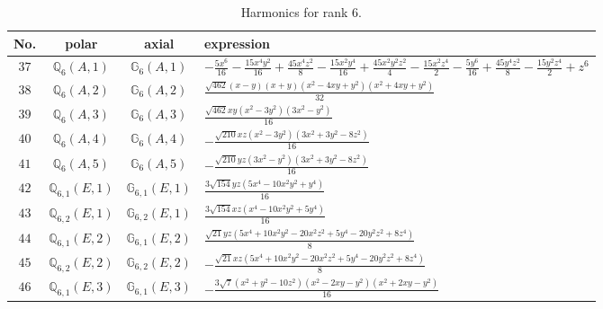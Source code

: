 \documentclass[fleqn,8pt,landscape]{jsarticle}
\begin{document}
\begin{table}[ht!]
\begin{center}
\caption{Harmonics for rank 6.}
\renewcommand{\arraystretch}{1.3}
\begin{tabular}{cccl} \hline \hline
No. & polar & axial & expression \\ \hline
$ 37 $ & $ \mathbb{Q}_{6}(A,1) $ & $ \mathbb{G}_{6}(A,1) $ & $ - \frac{5 x^{6}}{16} - \frac{15 x^{4} y^{2}}{16} + \frac{45 x^{4} z^{2}}{8} - \frac{15 x^{2} y^{4}}{16} + \frac{45 x^{2} y^{2} z^{2}}{4} - \frac{15 x^{2} z^{4}}{2} - \frac{5 y^{6}}{16} + \frac{45 y^{4} z^{2}}{8} - \frac{15 y^{2} z^{4}}{2} + z^{6} $ \\
$ 38 $ & $ \mathbb{Q}_{6}(A,2) $ & $ \mathbb{G}_{6}(A,2) $ & $ \frac{\sqrt{462} \left(x - y\right) \left(x + y\right) \left(x^{2} - 4 x y + y^{2}\right) \left(x^{2} + 4 x y + y^{2}\right)}{32} $ \\
$ 39 $ & $ \mathbb{Q}_{6}(A,3) $ & $ \mathbb{G}_{6}(A,3) $ & $ \frac{\sqrt{462} x y \left(x^{2} - 3 y^{2}\right) \left(3 x^{2} - y^{2}\right)}{16} $ \\
$ 40 $ & $ \mathbb{Q}_{6}(A,4) $ & $ \mathbb{G}_{6}(A,4) $ & $ - \frac{\sqrt{210} x z \left(x^{2} - 3 y^{2}\right) \left(3 x^{2} + 3 y^{2} - 8 z^{2}\right)}{16} $ \\
$ 41 $ & $ \mathbb{Q}_{6}(A,5) $ & $ \mathbb{G}_{6}(A,5) $ & $ - \frac{\sqrt{210} y z \left(3 x^{2} - y^{2}\right) \left(3 x^{2} + 3 y^{2} - 8 z^{2}\right)}{16} $ \\
$ 42 $ & $ \mathbb{Q}_{6,1}(E,1) $ & $ \mathbb{G}_{6,1}(E,1) $ & $ \frac{3 \sqrt{154} y z \left(5 x^{4} - 10 x^{2} y^{2} + y^{4}\right)}{16} $ \\
$ 43 $ & $ \mathbb{Q}_{6,2}(E,1) $ & $ \mathbb{G}_{6,2}(E,1) $ & $ \frac{3 \sqrt{154} x z \left(x^{4} - 10 x^{2} y^{2} + 5 y^{4}\right)}{16} $ \\
$ 44 $ & $ \mathbb{Q}_{6,1}(E,2) $ & $ \mathbb{G}_{6,1}(E,2) $ & $ \frac{\sqrt{21} y z \left(5 x^{4} + 10 x^{2} y^{2} - 20 x^{2} z^{2} + 5 y^{4} - 20 y^{2} z^{2} + 8 z^{4}\right)}{8} $ \\
$ 45 $ & $ \mathbb{Q}_{6,2}(E,2) $ & $ \mathbb{G}_{6,2}(E,2) $ & $ - \frac{\sqrt{21} x z \left(5 x^{4} + 10 x^{2} y^{2} - 20 x^{2} z^{2} + 5 y^{4} - 20 y^{2} z^{2} + 8 z^{4}\right)}{8} $ \\
$ 46 $ & $ \mathbb{Q}_{6,1}(E,3) $ & $ \mathbb{G}_{6,1}(E,3) $ & $ - \frac{3 \sqrt{7} \left(x^{2} + y^{2} - 10 z^{2}\right) \left(x^{2} - 2 x y - y^{2}\right) \left(x^{2} + 2 x y - y^{2}\right)}{16} $ \\

\end{tabular}
\end{center}
\end{table}
\end{document}
